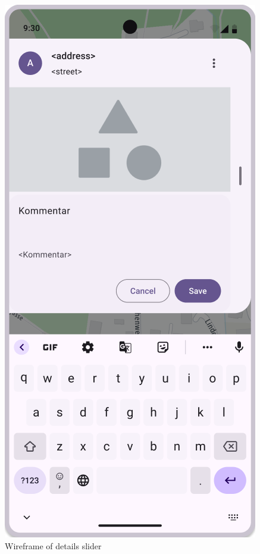 \begin{figure}[H]
\begin{minipage}{0.3\textwidth}
        \includegraphics[width=\textwidth]{images/paul/wireframes/detailsScreen.png}
        \caption{Wireframe of details slider}

\end{minipage}
\end{figure}
